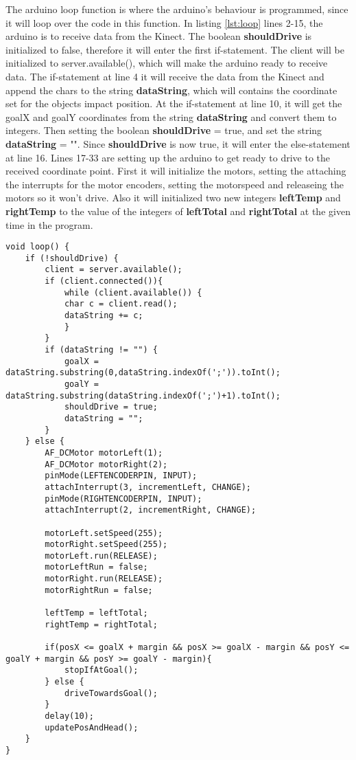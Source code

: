 The arduino loop function is where the arduino's behaviour is programmed, since it will loop over the code in this function. In listing \ref{lst:loop} lines 2-15, the arduino is to receive data from the Kinect. The boolean \textbf{shouldDrive} is initialized to false, therefore it will enter the first if-statement. The client will be initialized to server.available(), which will make the arduino ready to receive data. The if-statement at line 4 it will receive the data from the Kinect and append the chars to the string \textbf{dataString}, which will contains the coordinate set for the objects impact position. \newline
At the if-statement at line 10, it will get the goalX and goalY coordinates from the string \textbf{dataString} and convert them to integers. Then setting the boolean \textbf{shouldDrive} = true, and set the string \textbf{dataString} = "". \newline
Since \textbf{shouldDrive} is now true, it will enter the else-statement at line 16. Lines 17-33 are setting up the arduino to get ready to drive to the received coordinate point. First it will initialize the motors, setting the attaching the interrupts for the motor encoders, setting the motorspeed and releaseing the motors so it won't drive. Also it will initialized two new integers \textbf{leftTemp} and \textbf{rightTemp} to the value of the integers of \textbf{leftTotal} and \textbf{rightTotal} at the given time in the program.

\begin{lstlisting}[caption={The arduino loop function}, label={lst:loop}]
void loop() {
	if (!shouldDrive) {
		client = server.available();
		if (client.connected()){
			while (client.available()) {
			char c = client.read(); 
			dataString += c;
			}
		}
		if (dataString != "") {
			goalX = dataString.substring(0,dataString.indexOf(';')).toInt();
			goalY = dataString.substring(dataString.indexOf(';')+1).toInt();
			shouldDrive = true;
			dataString = "";
		}
	} else {
		AF_DCMotor motorLeft(1);
		AF_DCMotor motorRight(2);
		pinMode(LEFTENCODERPIN, INPUT);
		attachInterrupt(3, incrementLeft, CHANGE);
		pinMode(RIGHTENCODERPIN, INPUT);
		attachInterrupt(2, incrementRight, CHANGE);
		
		motorLeft.setSpeed(255);
		motorRight.setSpeed(255);			
		motorLeft.run(RELEASE);
		motorLeftRun = false;
		motorRight.run(RELEASE);
		motorRightRun = false;
		
		leftTemp = leftTotal;
		rightTemp = rightTotal;
		
		if(posX <= goalX + margin && posX >= goalX - margin && posY <= goalY + margin && posY >= goalY - margin){
			stopIfAtGoal();
		} else {
			driveTowardsGoal();  
		}
		delay(10);
		updatePosAndHead();
	}
}
\end{lstlisting}



